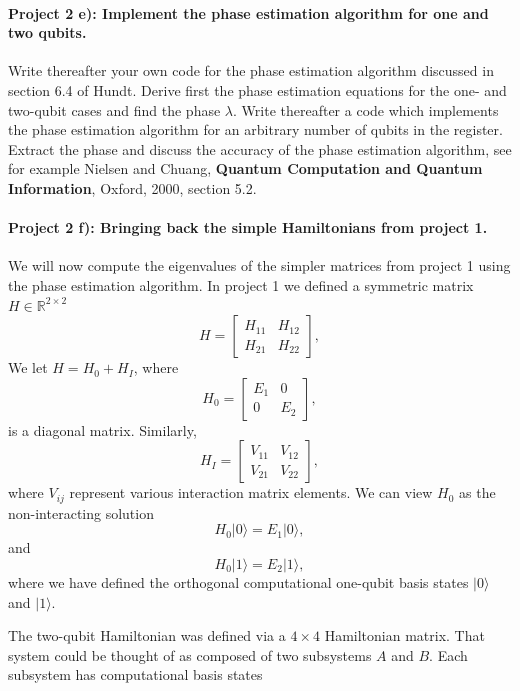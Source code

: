 \documentclass[%
oneside,                 %
final,                   %
10pt]{article}
\begin{document}
\paragraph{Project 2 e): Implement the phase estimation algorithm for one and two qubits.}
Write thereafter your own code for the phase estimation algorithm
discussed in section 6.4 of Hundt. Derive first the phase estimation
equations for the one- and two-qubit cases and find the phase
$\lambda$. Write thereafter a code which implements the phase
estimation algorithm for an arbitrary number of qubits in the
register. Extract the phase and discuss the accuracy of the phase
estimation algorithm, see for example Nielsen and Chuang, \textbf{Quantum Computation and Quantum Information}, Oxford, 2000, section 5.2.

\paragraph{Project 2 f): Bringing back the simple Hamiltonians from project 1.}
We will now compute the eigenvalues of the simpler matrices from project 1 using the phase estimation algorithm.
In project 1 we defined a  symmetric matrix  $H\in {\mathbb{R}}^{2\times 2}$
\[
H = \begin{bmatrix} H_{11} & H_{12} \\ H_{21} & H_{22}
\end{bmatrix},
\]
We  let $H = H_0 + H_I$, where
\[
H_0= \begin{bmatrix} E_1 & 0 \\ 0 & E_2\end{bmatrix},
\]
is a diagonal matrix. Similarly,
\[
H_I= \begin{bmatrix} V_{11} & V_{12} \\ V_{21} & V_{22}\end{bmatrix},
\]
where $V_{ij}$ represent various interaction matrix elements.
We can view $H_0$ as the non-interacting solution
\begin{equation}
       H_0\vert 0 \rangle =E_1\vert 0 \rangle,
\end{equation}
and
\begin{equation}
       H_0\vert 1\rangle =E_2\vert 1\rangle,
\end{equation}
where we have defined the orthogonal computational one-qubit basis states $\vert 0\rangle$ and $\vert 1\rangle$.

The two-qubit Hamiltonian was defined via a $4\times 4$ Hamiltonian matrix.
That system could be thought of as composed of two subsystems
$A$ and $B$. Each subsystem has computational basis states
\end{document}
